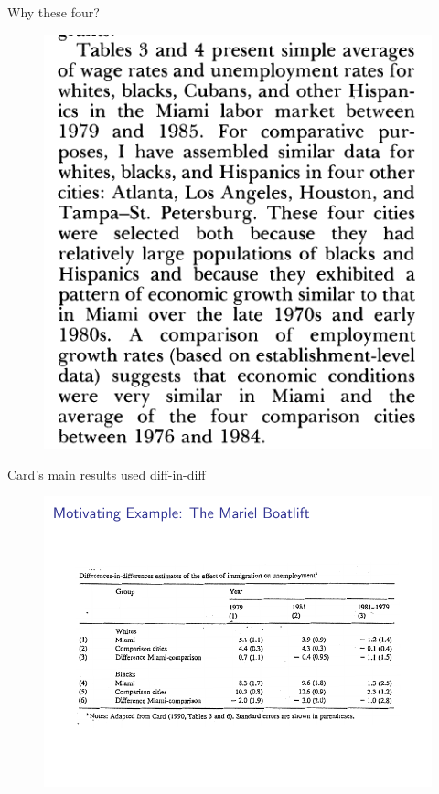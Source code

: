 \documentclass{beamer}
\begin{document}
\begin{frame}{Why these four?}

	\begin{figure}
	\includegraphics[scale=0.25]{./lecture_includes/card_illr.png}
	\end{figure}

\end{frame}

\begin{frame}{Card's main results used diff-in-diff}
	
	\begin{figure}
	\includegraphics[scale=0.75]{./lecture_includes/abadie_2.pdf}
	\end{figure}
\end{frame}
\end{document}
